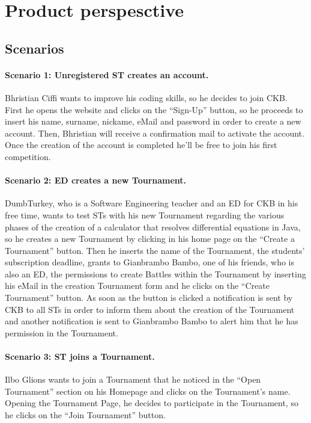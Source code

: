 \section{Product perspesctive}
\label{sec:product_perspesctive}%

\subsection{Scenarios}
\label{subsec:scenarios}%
\paragraph{Scenario 1: Unregistered ST creates an account.}
Bhristian Ciffi wants to improve his coding skills, so he decides to join CKB. First he opens the website and clicks on the “Sign-Up” button, so he proceeds to insert his name, surname, nickame, eMail and password in order to create a new account. Then, Bhristian will receive a confirmation mail to activate the account. Once the creation of the account is completed he’ll be free to join his first competition.

\paragraph{Scenario 2: ED creates a new Tournament.}
DumbTurkey, who is a Software Engineering teacher and an ED for CKB in his free time, wants to test STs with his new Tournament regarding the various phases of the creation of a calculator that resolves differential equations in Java, so he creates a new Tournament by clicking in his home page on the “Create a Tournament” button. Then he inserts the name of the Tournament, the students’ subscription deadline, grants to Gianbrambo Bambo, one of his friends, who is also an ED, the permissions to create Battles within the Tournament by inserting his eMail in the creation Tournament form and he clicks on the “Create Tournament” button. As soon as the button is clicked a notification is sent by CKB to all STs in order to inform them about the creation of the Tournament and another notification is sent to Gianbrambo Bambo to alert him that he has permission in the Tournament.

\paragraph{Scenario 3: ST joins a Tournament.}
Ilbo Glions wants to join a Tournament that he noticed in the “Open Tournament” section on his Homepage and clicks on the Tournament’s name. Opening the Tournament Page, he decides to participate in the Tournament, so he clicks on the “Join Tournament” button. 

